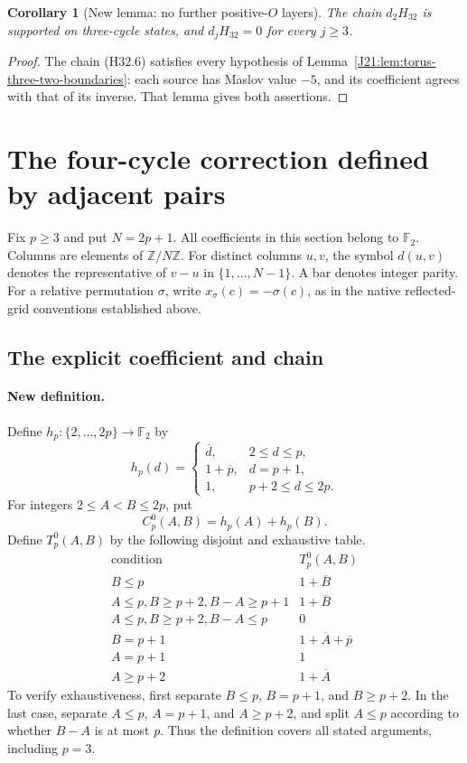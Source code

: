 \documentclass[11pt,oneside]{report}
\newtheorem{corollary}[theorem]{Corollary}
\theoremstyle{definition}
\numberwithin{equation}{section}
\begin{document}
\begin{corollary}[New lemma: no further positive-$O$ layers]
\label{J21:cor:h32-positive-types}
The chain $d_2H_{32}$ is supported on three-cycle states, and
$d_jH_{32}=0$ for every $j\geq3$.
\end{corollary}
\begin{proof}
The chain (H32.6) satisfies every hypothesis of
Lemma~\ref{J21:lem:torus-three-two-boundaries}: each source has Maslov value
$-5$, and its coefficient agrees with that of its inverse. That lemma
gives both assertions.
\end{proof}


\section{The four-cycle correction defined by adjacent pairs}
\label{J21:sec:h4-density}

Fix $p\geq3$ and put $N=2p+1$. All coefficients in this section
belong to $\mathbb F _2$. Columns are elements of
$\mathbb Z/N\mathbb Z$. For distinct columns $u,v$, the symbol
$d(u,v)$ denotes the representative of $v-u$ in
$\{1,\ldots,N-1\}$. A bar denotes integer parity.
For a relative permutation $\sigma$, write $x_\sigma(c)=-\sigma(c)$,
as in the native reflected-grid conventions established above.

\subsection{The explicit coefficient and chain}

\paragraph{New definition.}
Define $h_p:\{2,\ldots,2p\}\longrightarrow\mathbb F _2$ by
\[
 h_p(d)=
 \begin{cases}
  \overline d,&2\leq d\leq p,\\
  1+\overline p,&d=p+1,\\
  1,&p+2\leq d\leq2p.
 \end{cases}
 \tag{H4D.1}
\]
For integers $2\leq A<B\leq2p$, put
\[
                    C_p^0(A,B)=h_p(A)+h_p(B).
 \tag{H4D.2}
\]
Define $T_p^0(A,B)$ by the following disjoint and exhaustive table.
\[
\begin{array}{c|c}
 \text{condition}&T_p^0(A,B)\\\hline
 B\leq p&1+\overline B\\
 A\leq p, B\geq p+2, B-A\geq p+1&1+\overline B\\
 A\leq p, B\geq p+2, B-A\leq p&0\\
 B=p+1&1+\overline A+\overline p\\
 A=p+1&1\\
 A\geq p+2&1+\overline A
\end{array}
 \tag{H4D.3}
\]
To verify exhaustiveness, first separate $B\leq p$, $B=p+1$, and
$B\geq p+2$. In the last case, separate $A\leq p$, $A=p+1$, and
$A\geq p+2$, and split $A\leq p$ according to whether $B-A$ is at
most $p$. Thus the definition covers all stated arguments, including
$p=3$.
\end{document}
